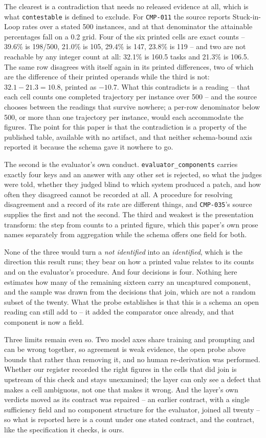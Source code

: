 The clearest is a contradiction that needs no released evidence at all, which is what
\texttt{contestable} is defined to exclude. For \texttt{CMP-011} the source reports
Stuck-in-Loop rates over a stated 500 instances, and at that denominator the attainable
percentages fall on a 0.2 grid. Four of the six printed cells are exact counts --
39.6\% is 198/500, 21.0\% is 105, 29.4\% is 147, 23.8\% is 119 -- and two are not reachable by
any integer count at all: 32.1\% is 160.5 tasks and 21.3\% is 106.5. The same row disagrees
with itself again in its printed differences, two of which are the difference of their printed
operands while the third is not: $32.1 - 21.3 = 10.8$, printed as $-10.7$. What this
contradicts is a reading -- that each cell counts one completed trajectory per instance over
500 -- and the source chooses between the readings that survive nowhere; a per-row denominator
below 500, or more than one trajectory per instance, would each accommodate the figures. The
point for this paper is that the contradiction is a property of the published table, available
with no artifact, and that neither schema-bound axis reported it because the schema gave it
nowhere to go.

The second is the evaluator's own conduct. \texttt{evaluator\_components} carries exactly four
keys and an answer with any other set is rejected, so what the judges were told, whether they
judged blind to which system produced a patch, and how often they disagreed cannot be recorded
at all. A procedure for resolving disagreement and a record of its rate are different things,
and \texttt{CMP-035}'s source supplies the first and not the second. The third and weakest is
the presentation transform: the step from counts to a printed figure, which this paper's own
prose names separately from aggregation while the schema offers one field for both.

None of the three would turn a \emph{not identified} into an \emph{identified}, which is the
direction this result runs; they bear on how a printed value relates to its counts and on the
evaluator's procedure. And four decisions is four. Nothing here estimates how many of the
remaining sixteen carry an uncaptured component, and the sample was drawn from the decisions
that join, which are not a random subset of the twenty. What the probe establishes is that
this is a schema an open reading can still add to -- it added the comparator once already, and
that component is now a field.

Three limits remain even so. Two model axes share training and prompting and can be wrong
together, so agreement is weak evidence, the open probe above bounds that rather than removing
it, and no human re-derivation was performed. Whether our register
recorded the right figures in the cells that did join is upstream of this check and stays
unexamined; the layer can only see a defect that makes a cell ambiguous, not one that makes it
wrong. And the layer's own verdicts moved as its contract was repaired -- an earlier contract,
with a single sufficiency field and no component structure for the evaluator, joined all twenty
-- so what is reported here is a count under one stated contract, and the contract, like the
specification it checks, is ours.

